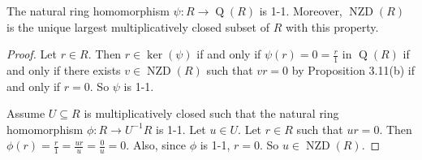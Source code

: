 \begin{example*}
\begin{enumerate}
\begin{comment}
                \end{tikzpicture}
                \ \ \ \ \ \ 
                \begin{tikzpicture}[node distance = 1.5cm, auto]
                    \node (R) {$R_2$};
                    \node (QR)[right of=R] {$\operatorname{Q}(R_2)$};
                    \node (L)[below of=QR] {$U^{-1}R_2$};
                    \node (r)[node distance=0.7cm, left of=R, above of=R] {$r_2$};
                    \node (qr)[node distance=0.7cm, right of=QR, above of=QR] {$\frac{r_2}{1}$};
                    \node (qru)[node distance=1.6cm, right of=QR] {$\frac{r_2}{u_2}$};
                    \node (lu)[below of=qru] {$\frac{\varphi_2(r_2)}{\varphi_2(u_2)}$};
                    \node (l)[node distance=0.7cm, below of=L] {$r_2/1 = \frac{r_2/1}{1/1}$};
                    \draw[->] (R) to node {$\psi_2$} (QR);
                    \draw[right hook->] (R) to node [swap]{$\varphi_2$} (L);
                    \draw[->,dashed] (QR) to node {$\ex !\ \overbar \varphi_2$} (L);
                    \draw[|->] (r) to node {} (qr);
                    \draw[|->,bend right] (r) to node {} (l);
                    \draw[|->,bend left=45] (qr) to node {} (l);
                    \draw[|->] (qru) to node {} (lu);
                \end{tikzpicture}
            \end{center}
            Thus, $\operatorname{Q}(R) \cong \operatorname{Q}(R/\langle \overbar{X}, \overbar{Z} \rangle) \times \operatorname{Q}(R/\langle \overbar{Y}, \overbar{W} \rangle) \cong \operatorname{Q}(k[Y,W]) \times \operatorname{Q}(k[X,Z]) \cong k(X,Z) \times k(Y,W)$ by (a).
        \end{comment}
    \end{enumerate}
\end{example*}

\begin{proposition}
    The natural ring homomorphism $\psi: R \to \operatorname{Q}(R)$ is 1-1. Moreover, $\operatorname{NZD}(R)$ is the unique largest multiplicatively closed subset of $R$ with this property.
\end{proposition}

\begin{proof}
    Let $r \in R$. Then $r \in \ker(\psi)$ if and only if $\psi(r) = 0 = \frac{r}{1}$ in $\operatorname{Q}(R)$ if and only if there exists $v \in \operatorname{NZD}(R)$ such that $vr = 0$ by Proposition 3.11(b) if and only if $r = 0$. So $\psi$ is 1-1. \par
    Assume $U \subseteq R$ is multiplicatively closed such that the natural ring homomorphism $\phi: R \to U^{-1}R$ is 1-1. Let $u \in U$. Let $r \in R$ such that $ur = 0$. Then $\phi(r) = \frac{r}{1} = \frac{ur}{u} = \frac{0}{u} = 0$. Also, since $\phi$ is 1-1, $r = 0$. So $u \in \operatorname{NZD}(R)$.
\end{proof}

